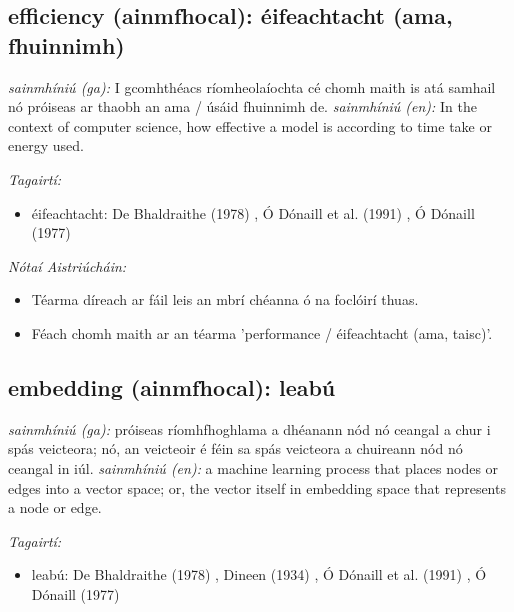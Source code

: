 \documentclass{article}
\begin{document}
\subsection*{efficiency (ainmfhocal): éifeachtacht (ama, fhuinnimh)} 
 \noindent \textit{sainmhíniú (ga):} I gcomhthéacs ríomheolaíochta cé chomh maith is atá samhail nó próiseas ar thaobh an ama / úsáid fhuinnimh de.
\newline\newline
 \noindent \textit{sainmhíniú (en):} In the context of computer science, how effective a model is according to time take or energy used.
\newline

 \noindent \textit{Tagairtí:}
\begin{itemize}
	\item éifeachtacht: De Bhaldraithe (1978) \cite{de-bhaldraithe}, Ó Dónaill et al. (1991) \cite{focloir-beag}, Ó Dónaill (1977) \cite{odonaill}
\end{itemize}

 \noindent \textit{Nótaí Aistriúcháin:}
\begin{itemize}
	\item Téarma díreach ar fáil leis an mbrí chéanna ó na foclóirí thuas.
	\item Féach chomh maith ar an téarma 'performance / éifeachtacht (ama, taisc)'.
\end{itemize}


\subsection*{embedding (ainmfhocal): leabú} 
 \noindent \textit{sainmhíniú (ga):} próiseas ríomhfhoghlama a dhéanann nód nó ceangal a chur i spás veicteora; nó, an veicteoir é féin sa spás veicteora a chuireann nód nó ceangal in iúl.
\newline\newline
 \noindent \textit{sainmhíniú (en):} a machine learning process that places nodes or edges into a vector space; or, the vector itself in embedding space that represents a node or edge.
\newline

 \noindent \textit{Tagairtí:}
\begin{itemize}
	\item leabú: De Bhaldraithe (1978) \cite{de-bhaldraithe}, Dineen (1934) \cite{dineen}, Ó Dónaill et al. (1991) \cite{focloir-beag}, Ó Dónaill (1977) \cite{odonaill}
\end{itemize}
\end{document}
